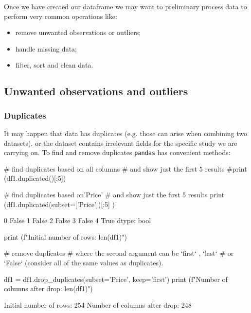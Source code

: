 Once we have created our dataframe we may want to preliminary process data to perform very common operations like:

\begin{itemize}
	\tightlist
\item remove unwanted observations or outliers;
\item handle missing data;
\item filter, sort and clean data.
\end{itemize}

\subsection{Unwanted observations and outliers}

\subsubsection{Duplicates}

It may happen that data has duplicates (e.g. those can arise when combining two datasets), or the dataset contains irrelevant fields for the specific study we are carrying on. To find and remove duplicates \texttt{pandas} has convenient methods:

\begin{ipythonnon}
# find duplicates based on all columns
# and show just the first 5 results
#print (df1.duplicated()[:5])

# find duplicates based on'Price'
# and show just the first 5 results
print (df1.duplicated(subset=['Price'])[:5] )
\end{ipythonnon}
\begin{ioutput}
0     False
1     False
2     False
3     False
4      True
dtype: bool
\end{ioutput}

\begin{ipythonnon}
print (f"Initial number of rows: {len(df1)}")

# remove duplicates
# where the second argument can be `first` , `last`
# or `False` (consider all of the same values as duplicates).

df1 = df1.drop_duplicates(subset='Price', keep='first')
print (f"Number of columns after drop: {len(df1)}")
\end{ipythonnon}
\begin{ioutput}
Initial number of rows: 254
Number of columns after drop: 248
\end{ioutput}

